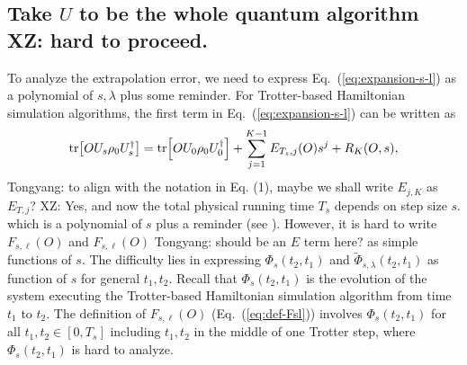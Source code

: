 \documentclass[11pt]{article}
\newcommand{\eq}[1]{(\ref{eq:#1})}
\newcommand{\xz}[1]{{\color{cyan} XZ: #1}}
\newcommand{\tyl}[1]{{\color{blue} Tongyang: #1}}
\begin{document}
\subsection{Take $U$ to be the whole quantum algorithm \xz{hard to proceed.}} 
To analyze the extrapolation error, we need to express Eq.~\eq{expansion-s-l} as a polynomial of $s,\lambda$ plus some reminder. For Trotter-based Hamiltonian simulation algorithms, the first term in Eq.~\eq{expansion-s-l} can be written as \[
\tr[OU_{s} \rho_{0} U_s^{\dagger}] = \tr[OU_0 \rho_0 U_0^{\dagger}]+\sum_{j=1}^{K-1} E_{T_s, j}(O)s^j+R_{K}(O,s),
\] 
\tyl{to align with the notation in Eq. (1), maybe we shall write $E_{j, K}$ as $E_{T, j}$?}\xz{Yes, and now the total physical running time $T_s$ depends on step size $s$.}
which is a polynomial of $s$ plus a reminder (see \cite{watson2024exponentially}). However, it is hard to write $F_{s,\ell}(O)$ and $F_{s,\ell}(O)$ \tyl{should be an $E$ term here?} as simple functions of $s$. The difficulty lies in expressing $\Phi_s(t_2, t_1)$ and  $\tilde{\Phi}_{s,\lambda}(t_2,t_1)$ as function of $s$ for general $t_1,t_2$. Recall that $\Phi_s(t_2, t_1)$ is the evolution of the system executing the Trotter-based Hamiltonian simulation algorithm from time $t_1$ to $t_2$. The definition of $F_{s,\ell}(O)$ (Eq.~\eq{def-Fsl}) involves $\Phi_s(t_2, t_1)$ for all $t_1,t_2\in [0,T_s]$ including $t_1, t_2$ in the middle of one Trotter step, where $\Phi_s(t_2, t_1)$ is hard to analyze. 
\end{document}

